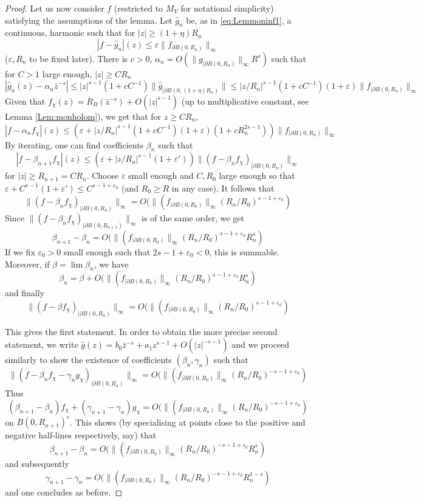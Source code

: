 \documentclass[10pt]{article}
\newcommand{\eps}{\varepsilon}
\begin{document}
\begin{proof}
Let us now consider $f$ (restricted to $M_V$ for notational simplicity) satisfying the assumptions of the lemma. Let $\hat g_n$ be, as in \eqref{eq:Lemmoninf1}, a continuous, harmonic such that for $|z|\geq (1+\eta)R_n$
$$|f-\hat g_n|(z)\leq \eps\|f_{\partial B(0,R_n)}\|_\infty$$
($\eps,R_n$ to be fixed later). There is $c>0$, $\alpha_n=O(\|g_{|\partial B(0,R_n)}\|_\infty R^s)$ such that for $C>1$ large enough, $|z|\geq CR_n$
$$|\hat g_n(z)-\alpha_n \bar z^{-s}|\leq |z|^{s-1}(1+cC^{-1})\|\hat g_{|\partial B(0,(1+\eta)R_n)}\| \leq |z/R_n|^{s-1}(1+cC^{-1})(1+\eps)\|f_{|\partial B(0,R_n)}\|_\infty$$
Given that $f_\chi(z)=\overline R_B(\bar z^{-s})+O(|z|^{s-1})$ (up to multiplicative constant, see Lemma \ref{Lem:monholom}), we get that for $z\geq CR_n$,
$$|f-\alpha_nf_\chi|(z)\leq (\eps+|z/R_n|^{s-1}(1+cC^{-1})(1+\eps)(1+cR_n^{2s-1}))\|f_{|\partial B(0,R_n)}\|_\infty$$
By iterating, one can find coefficients $\beta_n$ such that
$$|f-\beta_{n+1} f_\chi|(z)\leq (\eps+|z/R_n|^{s-1}(1+\eps'))\|(f-\beta_n f_\chi)_{|\partial B(0,R_n)}\|_\infty$$
for $|z|\geq R_{n+1}=CR_n$. Choose $\eps$ small enough and $C,R_0$ large enough so that $\eps+C^{s-1}(1+\eps')\leq C^{s-1+\eps_0}$ (and $R_0\geq R$ in any case). It follows that
$$\|(f-\beta_n f_\chi)_{|\partial B(0,R_n)}\|_\infty=O(\|(f_{|\partial B(0,R_0)}\|_\infty(R_n/R_0)^{s-1+\eps_0})$$
Since $\|(f-\beta_n f_\chi)_{|\partial B(0,R_{n+1})}\|_\infty$ is of the same order, we get
$$\beta_{n+1}-\beta_n=O(\|(f_{|\partial B(0,R_0)}\|_\infty(R_n/R_0)^{s-1+\eps_0}R_n^s)$$
If we fix $\eps_0>0$ small enough such that $2s-1+\eps_0<0$, this is summable. Moreover, if $\beta=\lim\beta_n$, we have
$$\beta_n=\beta+O(\|(f_{|\partial B(0,R_0)}\|_\infty(R_n/R_0)^{s-1+\eps_0}R_n^s)$$
and finally
$$\|(f-\beta f_\chi)_{|\partial B(0,R_n)}\|_\infty=O(\|(f_{|\partial B(0,R_0)}\|_\infty(R_n/R_0)^{s-1+\eps_0})$$

This gives the first statement. In order to obtain the more precise second statement, we write $\hat g(z)=b_0\bar z^{-s}+a_1 z^{s-1}+O(|z|^{-s-1})$ and
we proceed similarly to show the existence of coefficients $(\beta_n,\gamma_n)$ such that
 $$\|(f-\beta_n f_\chi-\gamma_n g_\chi)_{|\partial B(0,R_n)}\|_\infty=O(\|(f_{|\partial B(0,R_0)}\|_\infty(R_n/R_0)^{-s-1+\eps_0})$$
Thus
$$(\beta_{n+1}-\beta_n)f_\chi+(\gamma_{n+1}-\gamma_n)g_\chi=O(\|(f_{|\partial B(0,R_0)}\|_\infty(R_n/R_0)^{-s-1+\eps_0})$$
on $B(0,R_{n+1})^c$. This shows (by specialising at points close to the positive and negative half-lines respectively, say) that
$$\beta_{n+1}-\beta_n=O(\|(f_{|\partial B(0,R_0)}\|_\infty(R_n/R_0)^{-s-1+\eps_0}R_n^s)$$
and subsequently
$$\gamma_{n+1}-\gamma_n=O(\|(f_{|\partial B(0,R_0)}\|_\infty(R_n/R_0)^{-s-1+\eps_0}R_n^{1-s})$$
and one concludes as before.
\end{proof}
\end{document}
